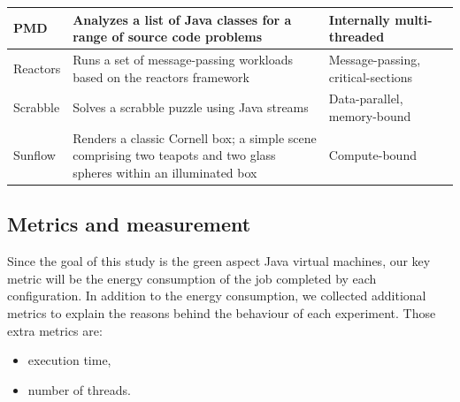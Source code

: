 \begin{table}
{\begin{tabular}{|p{0.1\linewidth}|p{0.6\linewidth}|p{0.3\linewidth}|}
            \hline
            \textsf{PMD}          & Analyzes a list of Java classes for a range of source code problems                                                  & Internally multi-threaded                  \\
            \hline
            \textsf{Reactors}     & Runs a set of message-passing workloads based on the reactors framework                                              & Message-passing, critical-sections         \\
            \hline
            \textsf{Scrabble}     & Solves a scrabble puzzle using Java streams                                                                          & Data-parallel, memory-bound                \\
            \hline
            \textsf{Sunflow}      & Renders a classic Cornell box; a simple scene comprising two teapots and two glass spheres within an illuminated box & Compute-bound                              \\
            \hline
        \end{tabular}
    }
\end{table}

\subsection{Metrics and measurement}
Since the goal of this study is the green aspect Java virtual machines, our key metric will be the energy consumption of the job completed by each configuration.
In addition to the energy consumption, we collected additional metrics to explain the reasons behind the behaviour of each experiment.
Those extra metrics are:
\begin{itemize}
    \item execution time,
    \item number of threads.
\end{itemize}


